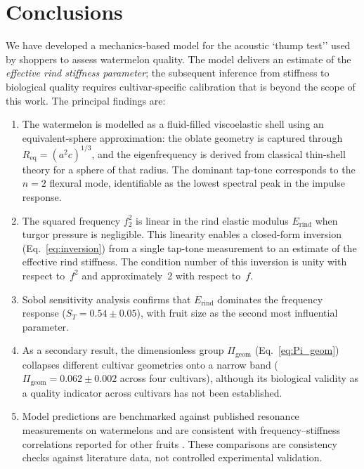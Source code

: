 \section{Conclusions}
\label{sec:conclusion}

We have developed a mechanics-based model for the acoustic `thump test''
used by shoppers to assess watermelon quality.  The model delivers an estimate of
the \emph{effective rind stiffness parameter}; the subsequent inference
from stiffness to biological quality requires cultivar-specific
calibration that is beyond the scope of this work.  The principal
findings are:

\begin{enumerate}
  \item The watermelon is modelled as a fluid-filled viscoelastic shell
    using an equivalent-sphere approximation: the oblate geometry is
    captured through $R_{\mathrm{eq}} = (a^2 c)^{1/3}$, and the
    eigenfrequency is derived from classical thin-shell theory for a
    sphere of that radius.  The dominant tap-tone corresponds to the
    $n = 2$ flexural mode, identifiable as the lowest spectral peak
    in the impulse response.

  \item The squared frequency $f_2^2$ is linear in the rind
    elastic modulus $E_{\mathrm{rind}}$ when turgor pressure is
    negligible.  This linearity enables a closed-form inversion
    (Eq.~\ref{eq:inversion}) from a single tap-tone measurement to an
    estimate of the effective rind stiffness.  The condition number of
    this inversion is unity with respect to~$f^2$ and
    approximately~2 with respect to~$f$.

  \item Sobol sensitivity analysis confirms that
    $E_{\mathrm{rind}}$ dominates the frequency response
    ($S_T = 0.54 \pm 0.05$), with fruit size as the second most influential
    parameter.

  \item As a secondary result, the dimensionless group
    $\Pi_{\mathrm{geom}}$ (Eq.~\ref{eq:Pi_geom}) collapses different
    cultivar geometries onto a narrow band
    ($\Pi_{\mathrm{geom}} = 0.062 \pm 0.002$ across four cultivars),
    although its biological validity as a quality indicator across
    cultivars has not been established.

  \item Model predictions are benchmarked against published resonance
    measurements on watermelons \cite{Yamamoto1980} and are consistent
    with frequency--stiffness correlations reported for other fruits
    \cite{DeBelieetal2000, ChenDeBaerdemaeker1993}.  These comparisons
    are consistency checks against literature data, not controlled
    experimental validation.
\end{enumerate}

